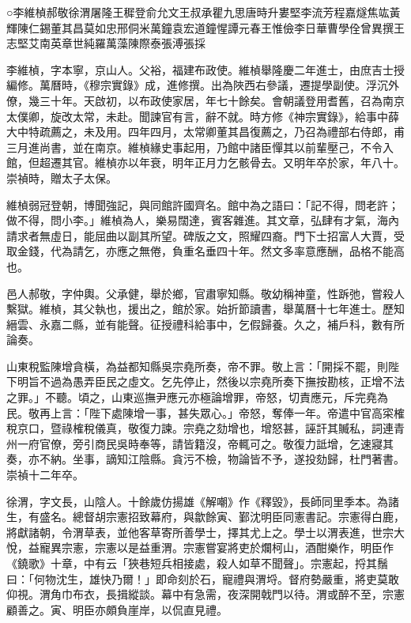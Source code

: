 
\begin{pinyinscope}
○李維楨郝敬徐渭屠隆王穉登俞允文王叔承瞿九思唐時升婁堅李流芳程嘉燧焦竑黃輝陳仁錫董其昌莫如忠邢侗米萬鐘袁宏道鐘惺譚元春王惟儉李日華曹學佺曾異撰王志堅艾南英章世純羅萬藻陳際泰張溥張採

李維楨，字本寧，京山人。父裕，福建布政使。維楨舉隆慶二年進士，由庶吉士授編修。萬曆時，《穆宗實錄》成，進修撰。出為陜西右參議，遷提學副使。浮沉外僚，幾三十年。天啟初，以布政使家居，年七十餘矣。會朝議登用耆舊，召為南京太僕卿，旋改太常，未赴。聞諫官有言，辭不就。時方修《神宗實錄》，給事中薛大中特疏薦之，未及用。四年四月，太常卿董其昌復薦之，乃召為禮部右侍郎，甫三月進尚書，並在南京。維楨緣史事起用，乃館中諸臣憚其以前輩壓己，不令入館，但超遷其官。維楨亦以年衰，明年正月力乞骸骨去。又明年卒於家，年八十。崇禎時，贈太子太保。

維楨弱冠登朝，博聞強記，與同館許國齊名。館中為之語曰：「記不得，問老許；做不得，問小李。」維楨為人，樂易闊達，賓客雜進。其文章，弘肆有才氣，海內請求者無虛日，能屈曲以副其所望。碑版之文，照耀四裔。門下士招富人大賈，受取金錢，代為請乞，亦應之無倦，負重名垂四十年。然文多率意應酬，品格不能高也。

邑人郝敬，字仲輿。父承健，舉於鄉，官肅寧知縣。敬幼稱神童，性跅弛，嘗殺人繫獄。維楨，其父執也，援出之，館於家。始折節讀書，舉萬曆十七年進士。歷知縉雲、永嘉二縣，並有能聲。征授禮科給事中，乞假歸養。久之，補戶科，數有所論奏。

山東稅監陳增貪橫，為益都知縣吳宗堯所奏，帝不罪。敬上言：「開採不罷，則陛下明旨不過為愚弄臣民之虛文。乞先停止，然後以宗堯所奏下撫按勘核，正增不法之罪。」不聽。頃之，山東巡撫尹應元亦極論增罪，帝怒，切責應元，斥完堯為民。敬再上言：「陛下處陳增一事，甚失眾心。」帝怒，奪俸一年。帝遣中官高寀榷稅京口，暨祿榷稅儀真，敬復力諫。宗堯之劾增也，增怒甚，誣訐其贓私，詞連青州一府官僚，旁引商民吳時奉等，請皆籍沒，帝輒可之。敬復力詆增，乞速寢其奏，亦不納。坐事，謫知江陰縣。貪污不檢，物論皆不予，遂投劾歸，杜門著書。崇禎十二年卒。

徐渭，字文長，山陰人。十餘歲仿揚雄《解嘲》作《釋毀》，長師同里季本。為諸生，有盛名。總督胡宗憲招致幕府，與歙餘寅、鄞沈明臣同憲書記。宗憲得白鹿，將獻諸朝，令渭草表，並他客草寄所善學士，擇其尤上之。學士以渭表進，世宗大悅，益寵異宗憲，宗憲以是益重渭。宗憲嘗宴將吏於爛柯山，酒酣樂作，明臣作《鐃歌》十章，中有云「狹巷短兵相接處，殺人如草不聞聲」。宗憲起，捋其鬚曰：「何物沈生，雄快乃爾！」即命刻於石，寵禮與渭埒。督府勢嚴重，將吏莫敢仰視。渭角巾布衣，長揖縱談。幕中有急需，夜深開戟門以待。渭或醉不至，宗憲顧善之。寅、明臣亦頗負崖岸，以侃直見禮。


\end{pinyinscope}
